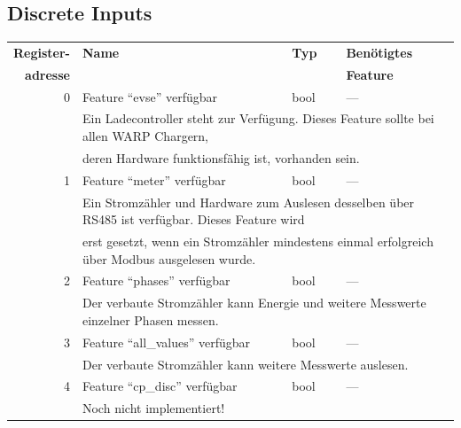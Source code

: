 \documentclass[a4paper,10pt]{article}
\newcommand{\tdesc}[1]{\multicolumn{3}{l}{\footnotesize #1}}
\begin{document}
\subsection*{Discrete Inputs}
\begin{tabularx}{\textwidth}{rXll} \toprule
    \textbf{Register-} & \textbf{Name} & \textbf{Typ} & \textbf{Benötigtes}                                                     \\
    \textbf{adresse}   &      &     & \textbf{Feature}                                                                          \\ \midrule
0             & Feature \enquote{evse} verfügbar        & bool         & ---                                                    \\
              & \tdesc{Ein Ladecontroller steht zur Verfügung. Dieses Feature sollte bei allen WARP Chargern,}                  \\
              & \tdesc{deren Hardware funktionsfähig ist, vorhanden sein.}                                                      \\ \cmidrule{2-4}
1             & Feature \enquote{meter} verfügbar       & bool         & ---                                                    \\
              & \tdesc{Ein Stromzähler und Hardware zum Auslesen desselben über RS485 ist verfügbar. Dieses Feature wird }      \\
              & \tdesc{erst gesetzt, wenn ein Stromzähler mindestens einmal erfolgreich über Modbus ausgelesen wurde.}          \\ \cmidrule{2-4}
2             & Feature \enquote{phases} verfügbar      & bool         & ---                                                    \\
              & \tdesc{Der verbaute Stromzähler kann Energie und weitere Messwerte einzelner Phasen messen.}                    \\ \cmidrule{2-4}
3             & Feature \enquote{all\_values} verfügbar & bool         & ---                                                    \\
              & \tdesc{Der verbaute Stromzähler kann weitere Messwerte auslesen.}                                               \\ \cmidrule{2-4}
4             & Feature \enquote{cp\_disc} verfügbar    & bool         & ---                                                    \\
              & \tdesc{Noch nicht implementiert!}                                                                               \\ \cmidrule{2-4}

\end{tabularx}
\end{document}
